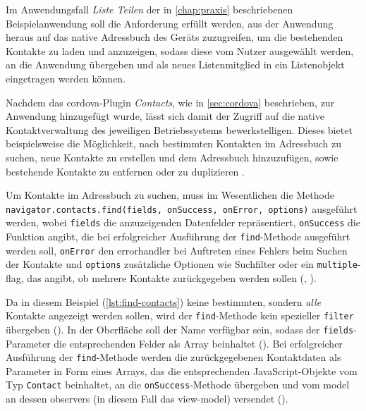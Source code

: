 Im Anwendungsfall \emph{Liste Teilen} der in \autoref{chap:praxis} beschriebenen Beispielanwendung  soll die Anforderung erfüllt werden, aus der Anwendung heraus auf das native Adressbuch des Geräts zuzugreifen, um die bestehenden Kontakte zu laden und anzuzeigen, sodass diese vom Nutzer ausgewählt werden, an die Anwendung übergeben und als neues Listenmitglied in ein Listenobjekt eingetragen werden können.

Nachdem das \gls{cordova}-Plugin \emph{Contacts}, wie in \autoref{sec:cordova} beschrieben, zur Anwendung hinzugefügt wurde, lässt sich damit der Zugriff auf die native Kontaktverwaltung des jeweiligen Betriebssystems bewerkstelligen.
Dieses bietet beispielsweise die Möglichkeit, nach bestimmten Kontakten im Adressbuch zu suchen, neue Kontakte zu erstellen und dem Adressbuch hinzuzufügen, sowie bestehende Kontakte zu entfernen oder zu duplizieren \cite{Cordova_Plugin_Registry_Contacts}.

Um Kontakte im Adressbuch zu suchen, muss im Wesentlichen die Methode \lstinline|navigator.contacts.find(fields, onSuccess, onError, options)| ausgeführt werden, wobei \lstinline|fields| die anzuzeigenden Datenfelder repräsentiert, \lstinline|onSuccess| die Funktion angibt, die bei erfolgreicher Ausführung der \lstinline|find|-Methode ausgeführt werden soll, \lstinline|onError| den \gls{errorhandler} bei Auftreten eines Fehlers beim Suchen der Kontakte und \lstinline|options| zusätzliche Optionen wie Suchfilter oder ein \lstinline|multiple|-\gls{flag}, das angibt, ob mehrere Kontakte zurückgegeben werden sollen (, ).

Da in diesem Beispiel (\autoref{lst:find-contacts}) keine bestimmten, sondern \emph{alle} Kontakte angezeigt werden sollen, wird der \lstinline|find|-Methode kein spezieller \lstinline|filter| übergeben (). In der Oberfläche soll der Name verfügbar sein, sodass der \lstinline|fields|-Parameter die entsprechenden Felder als Array beinhaltet (). Bei erfolgreicher Ausführung der \lstinline|find|-Methode werden die zurückgegebenen Kontaktdaten als Parameter in Form eines Arrays, das die entsprechenden JavaScript-Objekte vom Typ \lstinline|Contact| beinhaltet, an die \lstinline|onSuccess|-Methode übergeben und vom \gls{model} an dessen \glspl{observer} (in diesem Fall das \gls{view-model}) versendet ().

